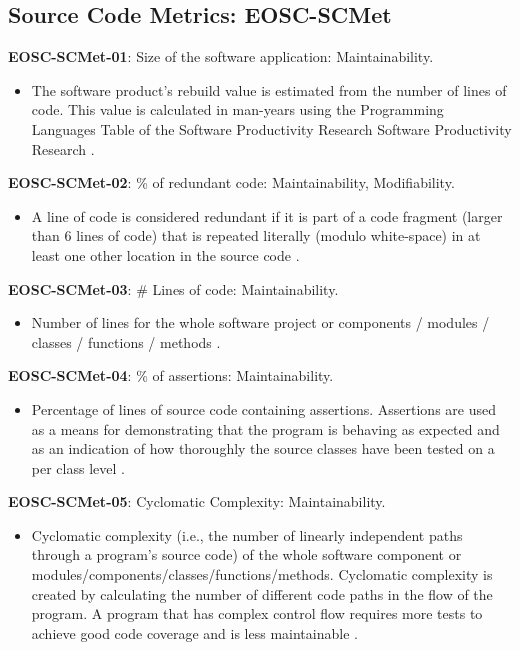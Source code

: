 \subsection{Source Code Metrics: EOSC-SCMet}

\textbf{EOSC-SCMet-01}: Size of the software application: Maintainability.

\begin{itemize}
    \item The software product's rebuild value is estimated from the number of lines of code. This value is calculated in man-years using the Programming Languages Table of the Software Productivity Research Software Productivity Research \cite{baggen_standardized_2012}.
\end{itemize}

\textbf{EOSC-SCMet-02}: \% of redundant code: Maintainability, Modifiability.

\begin{itemize}
    \item A line of code is considered redundant if it is part of a code fragment (larger than 6 lines of code) that is repeated literally (modulo white-space) in at least one other location in the source code \cite{baggen_standardized_2012}.
\end{itemize}

\textbf{EOSC-SCMet-03}: \# Lines of code: Maintainability.

\begin{itemize}
    \item Number of lines for the whole software project or components / modules / classes / functions / methods \cite{montagud_systematic_2012,baggen_standardized_2012}.
\end{itemize}

\textbf{EOSC-SCMet-04}: \% of assertions: Maintainability.

\begin{itemize}
    \item Percentage of lines of source code containing assertions. Assertions are used as a means for demonstrating that the program is behaving as expected and as an indication of how thoroughly the source classes have been tested on a per class level \cite{nagappan_early_2005}.
\end{itemize}

\textbf{EOSC-SCMet-05}: Cyclomatic Complexity: Maintainability.

\begin{itemize}
    \item Cyclomatic complexity (i.e.,  the number of linearly independent paths through a program's source code) of the whole software component or modules/components/classes/functions/methods. Cyclomatic complexity is created by calculating the number of different code paths in the flow of the program. A program that has complex control flow requires more tests to achieve good code coverage and is less maintainable \cite{srisopha_software_2018,montagud_systematic_2012,baggen_standardized_2012,nagappan_early_2005,ogasawara_experiences_1996}.
\end{itemize}


